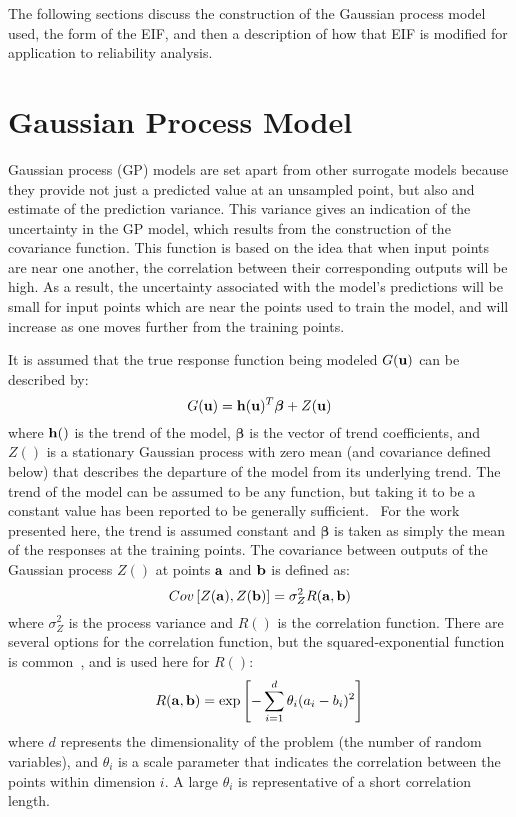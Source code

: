 The following sections discuss the construction of the Gaussian process model
used, the form of the EIF, and then a description of how that EIF is modified
for application to reliability analysis.

\section{Gaussian Process Model}\label{uq:ego:gpm}

Gaussian process (GP) models are set apart from other surrogate models because
they provide not just a predicted value at an unsampled point, but also and
estimate of the prediction variance.
This variance gives an indication of the uncertainty in the GP model, which
results from the construction of the covariance function. 
This function is based on the idea that when input points are near one another,
the correlation between their corresponding outputs will be high.
As a result, the uncertainty associated with the model's predictions will be
small for input points which are near the points used to train the model,
and will increase as one moves further from the training points.

It is assumed that the true response function being modeled $G({\bf u})$ can 
be described by:~\cite{Cre91}
\begin{equation}
G({\bf u})={\bf h}({\bf u})^T{\boldsymbol \beta} + Z({\bf u})
\end{equation}
\noindent where ${\bf h}()$ is the trend of the model, 
${\boldsymbol \beta}$ is the vector of trend coefficients, and
$Z()$ is a stationary Gaussian process with zero mean (and covariance defined 
below) that describes the departure of the model from its underlying trend.
The trend of the model can be assumed to be any function, but
taking it to be a constant value has been reported to be generally sufficient.~\cite{Sac89}
For the work presented here, the trend is assumed constant and
${\boldsymbol \beta}$ is taken as simply the mean of the responses at
the training points.
The covariance between outputs of the Gaussian process $Z()$ at points 
${\bf a}$ and ${\bf b}$ is defined as:
\begin{equation}
Cov \left[ Z({\bf a}),Z({\bf b}) \right] = \sigma_Z^2 R({\bf a},{\bf b})
\label{eq:cov}
\end{equation}
\noindent where $\sigma_Z^2$ is the process variance and $R()$ is the
correlation function.
There are several options for the correlation function, but the 
squared-exponential function is common~\cite{Sac89}, and is used here for $R()$:
\begin{equation}
R({\bf a},{\bf b}) = \exp \left[ -\sum_{i=1}^d \theta_i(a_i - b_i)^2 \right]
\end{equation}
\noindent where $d$ represents the dimensionality of the problem
(the number of random variables), and 
$\theta_i$ is a scale parameter that indicates the correlation between the 
points within dimension $i$.
A large $\theta_i$ is representative of a short correlation length.


